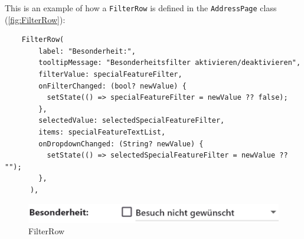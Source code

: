 This is an example of how a \texttt{FilterRow} is defined in the \texttt{AddressPage} class (\ref{fig:FilterRow}):
\lstset{style=mycsharp, caption=FilterRow in AddressPage}
\begin{lstlisting}
    FilterRow(
        label: "Besonderheit:",
        tooltipMessage: "Besonderheitsfilter aktivieren/deaktivieren",
        filterValue: specialFeatureFilter,
        onFilterChanged: (bool? newValue) {
          setState(() => specialFeatureFilter = newValue ?? false);
        },
        selectedValue: selectedSpecialFeatureFilter,
        items: specialFeatureTextList,
        onDropdownChanged: (String? newValue) {
          setState(() => selectedSpecialFeatureFilter = newValue ?? "");
        },
      ),
\end{lstlisting}


\begin{figure}[H]
    \centering
    \includegraphics[width=0.5\linewidth]{images/AdminPanel/FilterRow.png}
    \caption{FilterRow}
\end{figure}

